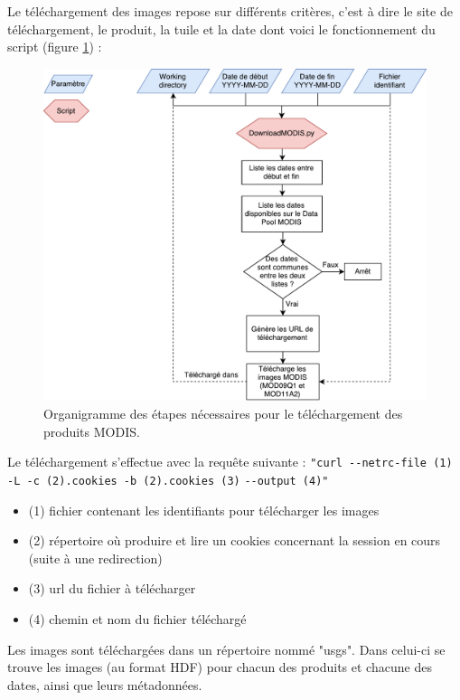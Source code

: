 \documentclass[10pt,a4paper]{article}
\begin{document}
Le téléchargement des images repose sur différents critères, c'est à dire le site de téléchargement, le produit, la tuile et la date dont voici le fonctionnement du script (figure \ref{orgDL}) :

\begin{figure}[!h]
\centering
\includegraphics[scale=0.53]{img/orgDownload.pdf}
\caption{Organigramme des étapes nécessaires pour le téléchargement des produits MODIS.}
\label{orgDL}
\end{figure}

Le téléchargement s'effectue avec la requête suivante :\newline
\verb!"curl --netrc-file (1) -L -c (2).cookies -b (2).cookies (3)! \newline \verb!--output (4)"!
\begin{itemize}
\item (1) fichier contenant les identifiants pour télécharger les images
\item (2) répertoire où produire et lire un cookies concernant la session en cours (suite à une redirection)
\item (3) url du fichier à télécharger
\item (4) chemin et nom du fichier téléchargé
\end{itemize}

Les images sont téléchargées dans un répertoire nommé "usgs". Dans celui-ci se trouve les images (au format HDF) pour chacun des produits et chacune des dates, ainsi que leurs métadonnées.
\end{document}
